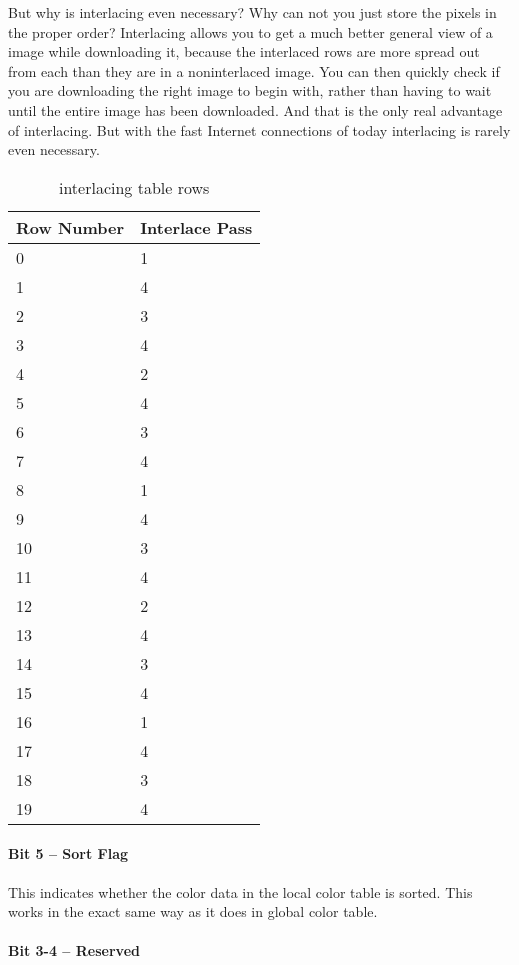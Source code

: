 But why is interlacing even necessary? Why can not you just store the
pixels in the proper order? Interlacing allows you to get a much
better general view of a \gif image while downloading it, because the
interlaced rows are more spread out from each than they are in a
noninterlaced image. You can then quickly check if you are downloading
the right image to begin with, rather than having to wait until the
entire image has been downloaded. And that is the only real advantage
of interlacing. But with the fast Internet connections of today
interlacing is rarely even necessary.


\begin{table}
  \centering
  \begin{tabular}{ll}
    \toprule
    Row Number & Interlace Pass \\
    \midrule
    0 & 1 \\
    1 & 4 \\
    2 & 3 \\
    3 & 4 \\
    4 & 2 \\
    5 & 4 \\
    6 & 3 \\
    7 & 4 \\
    8 & 1 \\
    9 & 4 \\
    10 & 3 \\
    11 & 4 \\
    12 & 2 \\
    13 & 4 \\
    14 & 3 \\
    15 & 4 \\
    16 & 1 \\
    17 & 4 \\
    18 & 3 \\
    19 & 4 \\
    \bottomrule
  \end{tabular}
  \caption{\gif interlacing table rows}
  \label{tab:gif-interlacing}
\end{table}

\paragraph{Bit 5 -- Sort Flag}

This indicates whether the color data in the local color table is
sorted. This works in the exact same way as it does in global color
table.

\paragraph{Bit 3-4 -- Reserved}

